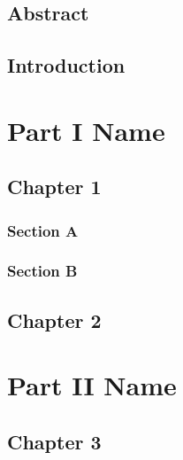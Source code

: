 \documentclass[english, twoside]{book}
\title{\titlecontent}
\author{Steffan S{\o}lvsten and Lorem Ipsum}
\date{Aarhus University \\ \mailto{{soelvsten,ipsum}@cs.au.dk} \\[2\baselineskip] \today}
\begin{document}
\frontmatter \pagestyle{empty}

\maketitle

\newpage
\chapter*{Abstract}
\lipsum[2] \lipsum[3]

\newpage

\setcounter{tocdepth}{1} \tableofcontents

\newpage
\chapter{Introduction} \label{chap:intro}
\lipsum

\mainmatter \pagestyle{fancy}
\part{Part I Name} %
  \chapter{Chapter 1}
  \lipsum

  \section{Section A}
  \lipsum

  \section{Section B}
  \lipsum

  \chapter{Chapter 2}
  \lipsum

\part{Part II Name}
  \chapter{Chapter 3}
  \lipsum
\end{document}
